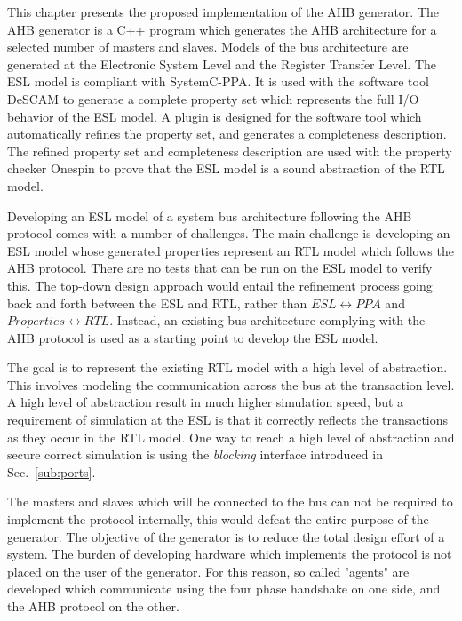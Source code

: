 \label{ch:impl}
This chapter presents the proposed implementation of the AHB generator. The AHB generator is a C++ program which generates the AHB architecture for a selected number of masters and slaves. Models of the bus architecture are generated at the Electronic System Level and the Register Transfer Level. The ESL model is compliant with SystemC-PPA. It is used with the software tool DeSCAM to generate a complete property set which represents the full I/O behavior of the ESL model. A plugin is designed for the software tool which automatically refines the property set, and generates a completeness description. The refined property set and completeness description are used with the property checker Onespin to prove that the ESL model is a sound abstraction of the RTL model. \par
Developing an ESL model of a system bus architecture following the AHB protocol comes with a number of challenges. The main challenge is developing an ESL model whose generated properties represent an RTL model which follows the AHB protocol. There are no tests that can be run on the ESL model to verify this. The top-down design approach would entail the refinement process going back and forth between the ESL and RTL, rather than $ESL\leftrightarrow PPA$ and $Properties\leftrightarrow RTL$. Instead, an existing bus architecture complying with the AHB protocol is used as a starting point to develop the ESL model. \par
The goal is to represent the existing RTL model with a high level of abstraction. This involves modeling the communication across the bus at the transaction level. A high level of abstraction result in much higher simulation speed, but a requirement of simulation at the ESL is that it correctly reflects the transactions as they occur in the RTL model. One way to reach a high level of abstraction and secure correct simulation is using the \textit{blocking} interface introduced in Sec.~\ref{sub:ports}. \par
The masters and slaves which will be connected to the bus can not be required to implement the protocol internally, this would defeat the entire purpose of the generator. The objective of the generator is to reduce the total design effort of a system. The burden of developing hardware which implements the protocol is not placed on the user of the generator. For this reason, so called "agents" are developed which communicate using the four phase handshake on one side, and the AHB protocol on the other. \par 
  

